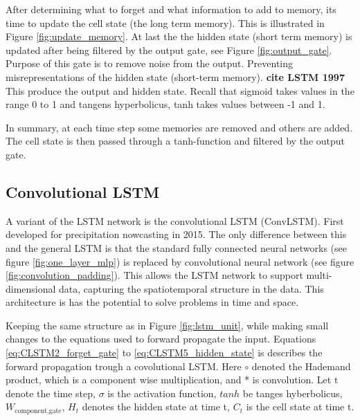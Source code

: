 \documentclass{article}
\begin{document}
After determining what to forget and what information to add to memory, its time to update the cell state (the long term memory). This is illustrated in Figure \ref{fig:update_memory}. At last the the hidden state (short term memory) is updated after being filtered by the output gate, see Figure \ref{fig:output_gate}. Purpose of this gate is to remove noise from the output. Preventing misrepresentations of the hidden state (short-term memory). \textbf{cite LSTM 1997} This produce the output and hidden state. Recall that sigmoid takes values in the range 0 to 1 and tangens hyperbolicus, tanh takes values between -1 and 1.

In summary, at each time step some memories are removed and others are added. The cell state is then passed through a tanh-function and filtered by the output gate. 

\subsection{Convolutional LSTM}  \label{sec:convolutional_lstm}
A variant of the LSTM network is the convolutional LSTM (ConvLSTM). First developed for precipitation nowcasting in 2015. The only difference between this and the general LSTM is that the standard fully connected neural networks (see figure \ref{fig:one_layer_mlp}) is replaced by convolutional neural network (see figure \ref{fig:convolution_padding}). This allows the LSTM network to support multi-dimensional data, capturing the spatiotemporal structure in the data. This architecture is has the potential to solve problems in time and space. 

Keeping the same structure as in Figure \ref{fig:lstm_unit}, while making small changes to the equations used to forward propagate the input. Equations \eqref{eq:CLSTM2_forget_gate} to \eqref{eq:CLSTM5_hidden_state} is describes the forward propagation trough a covolutional LSTM. Here $\circ$ denoted the Hademand product, which is a component wise multiplication, and * is convolution. 
Let t denote the time step, $\sigma$ is the activation function, $tanh$ be tanges hyberbolicus, $W_{\text{component}, \text{gate}}$, $H_{t}$ denotes the hidden state at time t, $C_{t}$ is the cell state at time t. 
\end{document}
